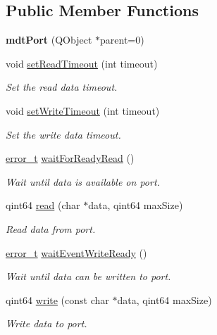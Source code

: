 \subsection*{Public Member Functions}
\begin{DoxyCompactItemize}
\item 
\hypertarget{classmdt_port_ac466eac9d1a54ea0e04c998660ad75ec}{
{\bfseries mdtPort} (QObject $\ast$parent=0)}
\label{classmdt_port_ac466eac9d1a54ea0e04c998660ad75ec}

\item 
\hypertarget{classmdt_port_aa77b266f23744f1b53ae589f986be101}{
void \hyperlink{classmdt_port_aa77b266f23744f1b53ae589f986be101}{setReadTimeout} (int timeout)}
\label{classmdt_port_aa77b266f23744f1b53ae589f986be101}

\begin{DoxyCompactList}\small\item\em Set the read data timeout. \end{DoxyCompactList}\item 
\hypertarget{classmdt_port_a2acb6e7bedacdadf78ee735dc611abfa}{
void \hyperlink{classmdt_port_a2acb6e7bedacdadf78ee735dc611abfa}{setWriteTimeout} (int timeout)}
\label{classmdt_port_a2acb6e7bedacdadf78ee735dc611abfa}

\begin{DoxyCompactList}\small\item\em Set the write data timeout. \end{DoxyCompactList}\item 
\hyperlink{classmdt_abstract_port_ad4121bb930c95887e77f8bafa065a85e}{error\_\-t} \hyperlink{classmdt_port_a84594fdb56cd455a366c69b0a9228020}{waitForReadyRead} ()
\begin{DoxyCompactList}\small\item\em Wait until data is available on port. \end{DoxyCompactList}\item 
qint64 \hyperlink{classmdt_port_ad8a196bb21b6ca76dffb068a1692904a}{read} (char $\ast$data, qint64 maxSize)
\begin{DoxyCompactList}\small\item\em Read data from port. \end{DoxyCompactList}\item 
\hyperlink{classmdt_abstract_port_ad4121bb930c95887e77f8bafa065a85e}{error\_\-t} \hyperlink{classmdt_port_a85e77a391f6f5782428beb2e6aee52f8}{waitEventWriteReady} ()
\begin{DoxyCompactList}\small\item\em Wait until data can be written to port. \end{DoxyCompactList}\item 
qint64 \hyperlink{classmdt_port_a62f4a6f2c547d40d3743ce893e0f64d6}{write} (const char $\ast$data, qint64 maxSize)
\begin{DoxyCompactList}\small\item\em Write data to port. \end{DoxyCompactList}\end{DoxyCompactItemize}


